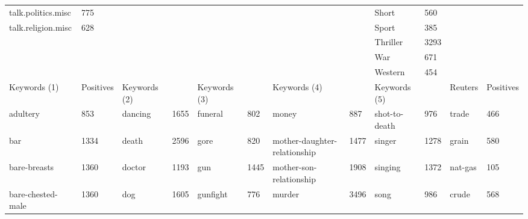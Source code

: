 \begin{landscape}
\begin{table}[]
\begin{tabular}{llllllllllll}
		talk.politics.misc                & 775       &                              &           &                            &           &                              &           & Short                     & 560       &              &           \\
		talk.religion.misc                & 628       &                              &           &                            &           &                              &           & Sport                     & 385       &              &           \\
		&           &                              &           &                            &           &                              &           & Thriller                  & 3293      &              &           \\
		&           &                              &           &                            &           &                              &           & War                       & 671       &              &           \\
		&           &                              &           &                            &           &                              &           & Western                   & 454       &              &           \\
		Keywords (1)                      & Positives & Keywords (2)                 &           & Keywords (3)               &           & Keywords (4)                 &           & Keywords (5)              &           & Reuters      & Positives \\
		adultery                          & 853       & dancing                      & 1655      & funeral                    & 802       & money                        & 887       & shot-to-death             & 976       & trade        & 466       \\
		bar                               & 1334      & death                        & 2596      & gore                       & 820       & mother-daughter-relationship & 1477      & singer                    & 1278      & grain        & 580       \\
		bare-breasts                      & 1360      & doctor                       & 1193      & gun                        & 1445      & mother-son-relationship      & 1908      & singing                   & 1372      & nat-gas      & 105       \\
		bare-chested-male                 & 1360      & dog                          & 1605      & gunfight                   & 776       & murder                       & 3496      & song                      & 986       & crude        & 568       \\

\end{tabular}
\end{table}
\end{landscape}
